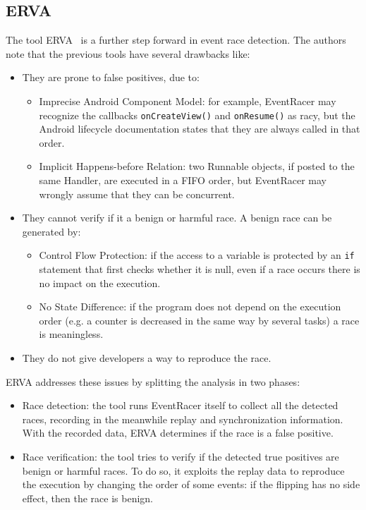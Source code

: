 \documentclass[11pt,a4paper,notitlepage]{article}
\begin{document}
\subsection{ERVA}
The tool ERVA~\cite{Hu:2016:AVR:2931037.2931069} is a further step forward in event race detection. The authors note that the previous tools have several drawbacks like:
\begin{itemize}
	\item They are prone to false positives, due to:
	\begin{itemize}
		\item Imprecise Android Component Model: for example, EventRacer may recognize the callbacks \texttt{onCreateView()} and \texttt{onResume()} as racy, but the Android lifecycle documentation states that they are always called in that order.
		\item Implicit Happens-before Relation: two Runnable objects, if posted to the same Handler, are executed in a FIFO order, but EventRacer may wrongly assume that they can be concurrent.
	\end{itemize}
	\item They cannot verify if it a benign or harmful race. A benign race can be generated by:
	\begin{itemize}
		\item Control Flow Protection: if the access to a variable is protected by an \texttt{if} statement that first checks whether it is null, even if a race occurs there is no impact on the execution.
		\item No State Difference: if the program does not depend on the execution order (e.g. a counter is decreased in the same way by several tasks) a race is meaningless.
	\end{itemize}
	\item They do not give developers a way to reproduce the race.
\end{itemize}
ERVA addresses these issues by splitting the analysis in two phases:
\begin{itemize}
	\item Race detection: the tool runs EventRacer itself to collect all the detected races, recording in the meanwhile replay and synchronization information. With the recorded data, ERVA determines if the race is a false positive.
	\item Race verification: the tool tries to verify if the detected true positives are benign or harmful races. To do so, it exploits the replay data to reproduce the execution by changing the order of some events: if the flipping has no side effect, then the race is benign.
\end{itemize}
\end{document}
